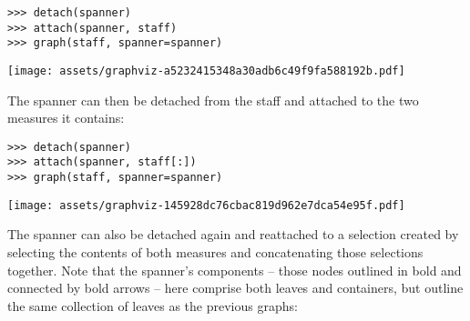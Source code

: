 \begin{comment}
<abjad>
detach(spanner)
attach(spanner, staff)
graph(staff, spanner=spanner)
</abjad>
\end{comment}

\begin{abjadbookoutput}
\begin{singlespacing}
\vspace{-0.5\baselineskip}
\begin{lstlisting}
>>> detach(spanner)
>>> attach(spanner, staff)
>>> graph(staff, spanner=spanner)
\end{lstlisting}
\noindent\texttt{[image: assets/graphviz-a5232415348a30adb6c49f9fa588192b.pdf]}
\end{singlespacing}
\end{abjadbookoutput}

\noindent The spanner can then be detached from the staff and attached to the
two measures it contains:

\begin{comment}
<abjad>
detach(spanner)
attach(spanner, staff[:])
graph(staff, spanner=spanner)
</abjad>
\end{comment}

\begin{abjadbookoutput}
\begin{singlespacing}
\vspace{-0.5\baselineskip}
\begin{lstlisting}
>>> detach(spanner)
>>> attach(spanner, staff[:])
>>> graph(staff, spanner=spanner)
\end{lstlisting}
\noindent\texttt{[image: assets/graphviz-145928dc76cbac819d962e7dca54e95f.pdf]}
\end{singlespacing}
\end{abjadbookoutput}

\noindent The spanner can also be detached again and reattached to a selection
created by selecting the contents of both measures and concatenating those
selections together. Note that the spanner's components -- those nodes outlined
in bold and connected by bold arrows -- here comprise both leaves and
containers, but outline the same collection of leaves as the previous graphs:

\begin{comment}
<abjad>
detach(spanner)
attach(spanner, measure_one[:] + measure_two[:])
graph(staff, spanner=spanner)
</abjad>
\end{comment}

